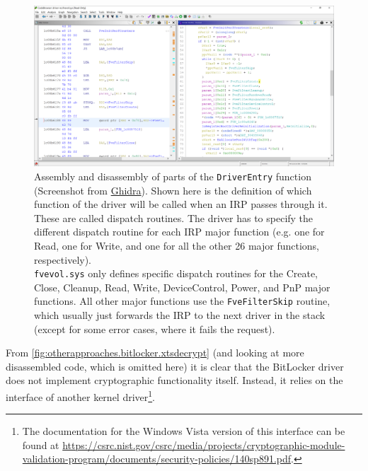 \begin{figure}[htb!]
	\center
	\includegraphics[scale=0.39]{../img/otherapproaches.bitlocker.driverentry.png}
	\caption[
		Assembly and disassembly of parts of the \texttt{DriverEntry} function
	]{
		Assembly and disassembly of parts of the \texttt{DriverEntry} function (Screenshot from \href{https://www.ghidra-sre.org}{Ghidra}). Shown here is the definition of which function of the driver will be called when an IRP passes through it. These are called dispatch routines. The driver has to specify the different dispatch routine for each IRP major function (e.g. one for Read, one for Write, and one for all the other 26 major functions, respectively). \\
		\texttt{fvevol.sys} only defines specific dispatch routines for the Create, Close, Cleanup, Read, Write, DeviceControl, Power, and PnP major functions. All other major functions use the \texttt{FveFilterSkip} routine, which usually just forwards the IRP to the next driver in the stack (except for some error cases, where it fails the request).
	}
	\label{fig:otherapproaches.bitlocker.driverentry}
\end{figure}

From \autoref{fig:otherapproaches.bitlocker.xtsdecrypt} (and looking at more disassembled code, which is omitted here) it is clear that the BitLocker driver does not implement cryptographic functionality itself. Instead, it relies on the interface of another kernel driver\footnote{\label{fn:otherapproaches.bitlocker.ksecdd} The documentation for the Windows Vista version of this interface can be found at \url{https://csrc.nist.gov/csrc/media/projects/cryptographic-module-validation-program/documents/security-policies/140sp891.pdf}.}.

